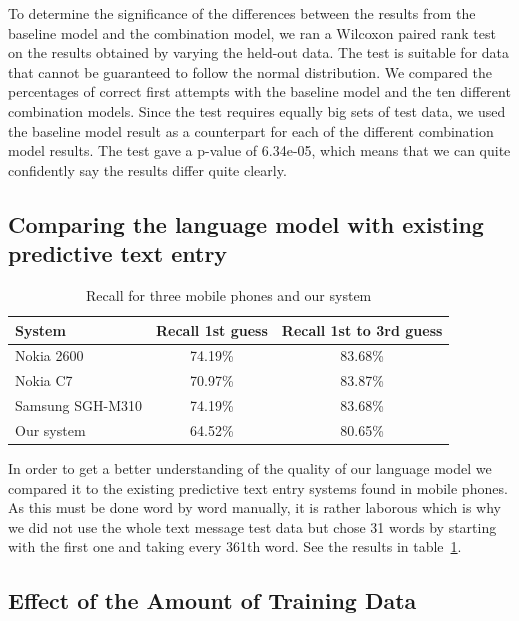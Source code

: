 \documentclass[a4paper,conference]{IEEEtran}
\begin{document}
To determine the significance of the differences between the results
from the baseline model and the combination model, we ran a Wilcoxon
paired rank test on the results obtained by varying the held-out
data. The test is suitable for data that cannot be guaranteed to
follow the normal distribution. We compared the percentages of correct
first attempts with the baseline model and the ten different
combination models. Since the test requires equally big sets of test
data, we used the baseline model result as a counterpart for each of
the different combination model results. The test gave a p-value of
6.34e-05, which means that we can quite confidently say the results
differ quite clearly.

\subsection{Comparing the language model with existing predictive text entry}

\begin{table}[!t]
\begin{center}
\caption{Recall for three mobile phones and our system}
\label{tab:phones}
\begin{tabular} {l c c}
System & Recall 1st guess & Recall 1st to 3rd guess\\
\hline
Nokia 2600 \rule{0pt}{2.6ex}  & 74.19\%          & 83.68\%\\
Nokia C7     & 70.97\%          & 83.87\%\\
Samsung SGH-M310 & 74.19\%      & 83.68\%\\
Our system & 64.52\% & 80.65\%  \\
\hline
\end{tabular}
\end{center}
\end{table}

In order to get a better understanding of the quality of our language
model we compared it to the existing predictive text entry systems
found in mobile phones. As this must be done word by word manually, it
is rather laborous which is why we did not use the whole text message
test data but chose 31 words by starting with the first one and taking
every 361th word. See the results in table~\ref{tab:phones}.

\subsection{Effect of the Amount of Training Data}
\end{document}
